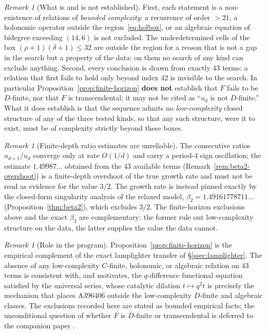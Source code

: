 \documentclass[11pt]{article}
\theoremstyle{plain}
\theoremstyle{definition}
\theoremstyle{remark}
\newtheorem{remark}[theorem]{Remark}
\begin{document}
\begin{remark}[What is and is not established]
\label{rmk:scope-finite-horizon}
First, each statement is a non-existence of relations of \emph{bounded
complexity}: a recurrence of order $> 21$, a holonomic operator outside the
region~\eqref{eq:holbox}, or an algebraic equation of bidegree
exceeding $(14,6)$ is not excluded. The underdetermined cells of the box
$(\rho+1)(\delta+1)\le 32$ are outside the region for a reason that is not a
gap in the search but a property of the data: on them no search of any kind
can exclude anything. Second, every conclusion is drawn from
exactly $43$ terms: a relation that first fails to hold only beyond index
$42$ is invisible to the search. In particular
Proposition~\ref{prop:finite-horizon} \textbf{does not} establish that $F$
fails to be $D$-finite, nor that $F$ is transcendental; it may not be cited
as ``$u_d$ is not $D$-finite.'' What it does establish is that the sequence
admits no \emph{low-complexity} closed structure of any of the three tested
kinds, so that any such structure, were it to exist, must be of complexity
strictly beyond these boxes.
\end{remark}

\begin{remark}[Finite-depth ratio estimates are unreliable]
\label{rmk:ratio-overshoot}
The consecutive ratios $u_{d+1}/u_d$ converge only at rate $O(1/d)$ and
carry a period-$4$ sign oscillation; the estimate $1.49987\ldots$ obtained
from the $43$ available terms (Remark~\ref{rem:beta2-overshoot}) is a
finite-depth overshoot of the true growth rate and must not be read as
evidence for the value $3/2$. The growth rate is instead pinned exactly by
the closed-form singularity analysis of the relaxed model,
$\beta_2 = 1.49161778711\ldots$ (Proposition~\ref{thm:beta2}), which
excludes $3/2$. The finite-horizon exclusions above and the exact
$\beta_2$ are complementary: the former rule out low-complexity structure
on the data, the latter supplies the value the data cannot.
\end{remark}

\begin{remark}[Role in the program]
\label{rmk:motivation-qdiff}
Proposition~\ref{prop:finite-horizon} is the empirical complement of the
exact lamplighter transfer of \S\ref{ssec:lamplighter}. The absence of any
low-complexity $C$-finite, holonomic, or algebraic relation on $43$ terms
is consistent with, and motivates, the $q$-difference functional equation
satisfied by the universal series, whose catalytic dilation $t \mapsto q^2 t$
is precisely the mechanism that places A396406 outside the low-complexity
$D$-finite and algebraic classes. The exclusions recorded here are stated
as bounded empirical facts; the unconditional question of whether $F$ is
$D$-finite or transcendental is deferred to the companion paper
\cite{Bonfioli2026b}.
\end{remark}
\end{document}
